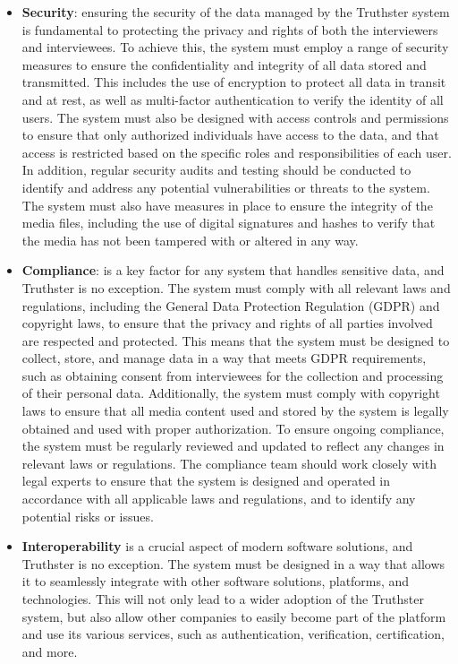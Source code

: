 \documentclass[target=mst,aauheader=]{thud}
\begin{document}
\begin{itemize}
    \item \textbf{Security}: ensuring the security of the data managed by the Truthster system is fundamental to protecting the privacy and rights of both the interviewers and interviewees. To achieve this, the system must employ a range of security measures to ensure the confidentiality and integrity of all data stored and transmitted. This includes the use of encryption to protect all data in transit and at rest, as well as multi-factor authentication \cite{mfa} to verify the identity of all users. The system must also be designed with access controls and permissions to ensure that only authorized individuals have access to the data, and that access is restricted based on the specific roles and responsibilities of each user. In addition, regular security audits and testing should be conducted to identify and address any potential vulnerabilities or threats to the system. The system must also have measures in place to ensure the integrity of the media files, including the use of digital signatures and hashes to verify that the media has not been tampered with or altered in any way.
    \item \textbf{Compliance}: is a key factor for any system that handles sensitive data, and Truthster is no exception. The system must comply with all relevant laws and regulations, including the General Data Protection Regulation (GDPR) and copyright laws, to ensure that the privacy and rights of all parties involved are respected and protected. This means that the system must be designed to collect, store, and manage data in a way that meets GDPR requirements, such as obtaining consent from interviewees for the collection and processing of their personal data. Additionally, the system must comply with copyright laws to ensure that all media content used and stored by the system is legally obtained and used with proper authorization. To ensure ongoing compliance, the system must be regularly reviewed and updated to reflect any changes in relevant laws or regulations. The compliance team should work closely with legal experts to ensure that the system is designed and operated in accordance with all applicable laws and regulations, and to identify any potential risks or issues.
    \item \textbf{Interoperability} is a crucial aspect of modern software solutions, and Truthster is no exception. The system must be designed in a way that allows it to seamlessly integrate with other software solutions, platforms, and technologies. This will not only lead to a wider adoption of the Truthster system, but also allow other companies to easily become part of the platform and use its various services, such as authentication, verification, certification, and more.

\end{itemize}
\end{document}
